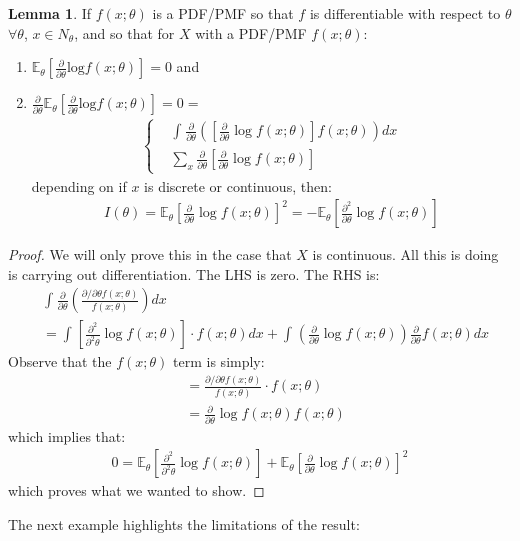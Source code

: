 \documentclass[11pt]{scrartcl}
\theoremstyle{definition}
\newtheorem{lemma}[theorem]{Lemma}
\theoremstyle{remark}
\newcommand{\EXth}[1]{\mathbb{E}_\theta \left[ #1 \right]}
\newcommand{\idx}[2]{\int_{#1}^{#2}}
\begin{document}
\begin{lemma}
	If $f(x; \theta)$ is a PDF/PMF so that $f$ is differentiable with respect to $\theta$ $\forall \theta$, $x \in N_\theta$, and so that for $X$ with a PDF/PMF $f(x; \theta)$: 
	\begin{enumerate}[noitemsep]
		\item $\EXth{\frac{\partial}{\partial \theta} \text{log}f(x; \theta)} =0$ and 
		\item $\frac{\partial}{\partial \theta} \EXth{\frac{\partial}{\partial \theta} \text{log}f(x; \theta) } = 0 = $ 
		\begin{align*}
			\begin{cases}
				& \idx{}{} \frac{\partial}{\partial \theta} \left( \left[  \frac{\partial}{\partial \theta} \log f(x; \theta)   \right]	f(x; \theta) 	\right) dx \\
				& \sum_{x} \frac{\partial}{\partial \theta} \left[ \frac{\partial}{\partial \theta} \log f(x; \theta) \right] 
			\end{cases}	
		\end{align*}
			depending on if $x$ is discrete or continuous, then: 
			\begin{align*}
				I(\theta) = \EXth{\frac{\partial}{\partial \theta} \log f(x; \theta)}^2	= - \EXth{\frac{\partial^2}{\partial \theta} \log f(x; \theta)}
			\end{align*}
	\end{enumerate}
\end{lemma}

\begin{proof}
	We will only prove this in the case that $X$ is continuous. All this is doing is carrying out differentiation. The LHS is zero. The RHS is: 
	\begin{align*}
		& \idx{}{} \frac{\partial}{\partial \theta} \left( 	\frac{\partial / \partial \theta f(x; \theta) }{f(x; \theta)}		\right) dx  	\\
		& = \idx{}{} \left[ 	\frac{\partial^2}{\partial^2 \theta}	 \log f(x; \theta)	\right] \cdot f(x; \theta) dx + \idx{}{}  \left( \frac{\partial}{\partial \theta} \log f(x; \theta) \right) \frac{\partial}{\partial \theta} f(x; \theta) dx 
	\end{align*}
	Observe that the $f(x; \theta)$ term is simply: 
	\begin{align*}
		& = \frac{\partial / \partial \theta f(x; \theta)}{f(x; \theta)} \cdot f(x; \theta) \\
		& = \frac{\partial}{\partial \theta} \log f(x; \theta) f(x; \theta) 
	\end{align*}
	which implies that: 
	\begin{align*}
		0 = \EXth{\frac{\partial^2}{\partial^2 \theta} \log f(x; \theta)} + \EXth{\frac{\partial}{\partial \theta} \log f(x; \theta)}^2 
	\end{align*}
	which proves what we wanted to show. 
\end{proof}
The next example highlights the limitations of the result: 
\end{document}
